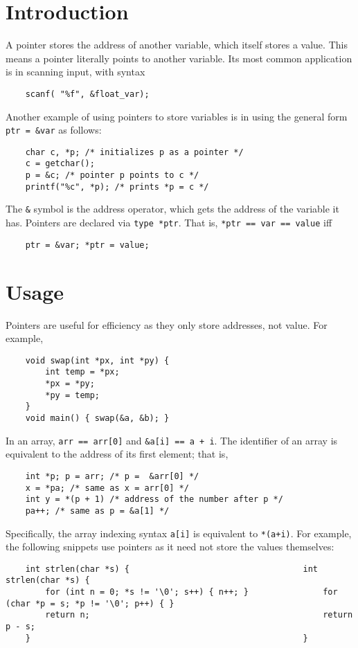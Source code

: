 \documentclass{tufte-book}
\begin{document}
\begin{fullwidth}
\section{Introduction}
A pointer stores the address of another variable, which itself stores a value. This means a pointer literally points to another variable. Its most common application is in scanning input, with syntax
\begin{lstlisting}
    scanf( "%f", &float_var);
\end{lstlisting}
Another example of using pointers to store variables is in using the general form \lstinline{ptr = &var} as follows:
\begin{lstlisting}
    char c, *p; /* initializes p as a pointer */
    c = getchar();
    p = &c; /* pointer p points to c */
    printf("%c", *p); /* prints *p = c */
\end{lstlisting}
The \lstinline{&} symbol is the address operator, which gets the address of the variable it has. Pointers are declared via \lstinline{type *ptr}. That is, \lstinline{*ptr == var == value} iff
\begin{lstlisting}
    ptr = &var; *ptr = value;
\end{lstlisting}

\section{Usage}
Pointers are useful for efficiency as they only store addresses, not value. For example,
\begin{lstlisting}
    void swap(int *px, int *py) {
        int temp = *px;
        *px = *py;
        *py = temp;
    }
    void main() { swap(&a, &b); }
\end{lstlisting}
In an array, \lstinline{arr == arr[0]} and \lstinline{&a[i] == a + i}. The identifier of an array is equivalent to the address of its first element; that is,
\begin{lstlisting}
    int *p; p = arr; /* p =  &arr[0] */
    x = *pa; /* same as x = arr[0] */
    int y = *(p + 1) /* address of the number after p */
    pa++; /* same as p = &a[1] */
\end{lstlisting}
Specifically, the array indexing syntax \lstinline{a[i]} is equivalent to \lstinline{*(a+i)}. For example, the following snippets use pointers as it need not store the values themselves:
\begin{lstlisting}
    int strlen(char *s) {                                   int strlen(char *s) {
        for (int n = 0; *s != '\0'; s++) { n++; }               for (char *p = s; *p != '\0'; p++) { }
        return n;                                               return p - s;
    }                                                       }
\end{lstlisting}


\end{fullwidth}
\end{document}
